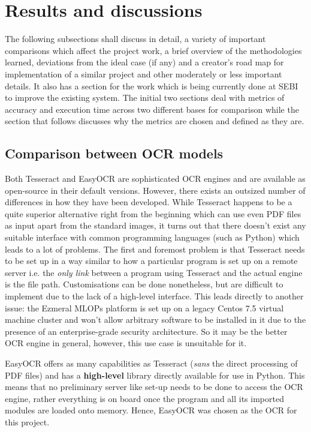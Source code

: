 \chapter{Results and discussions} \label{chapter5}

The following subsections shall discuss in detail, a variety of important comparisons which affect the project work, a brief overview of the methodologies learned, deviations from the ideal case (if any) and a creator’s road map for implementation of a similar project and other moderately or less important details. It also has a section for the work which is being currently done at SEBI to improve the existing system. The initial two sections deal with metrics of accuracy and execution time across two different bases for comparison while the section that follows discusses why the metrics are chosen and defined as they are. \par

\section{Comparison between OCR models} \label{comp_ocr}

Both Tesseract and EasyOCR are sophisticated OCR engines and are available as open-source in their default versions. However, there exists an outsized number of differences in how they have been developed. While Tesseract \cite{Google2015} happens to be a quite superior alternative right from the beginning which can use even PDF files as input apart from the standard images, it turns out that there doesn’t exist any suitable interface with common programming languages (such as Python) which leads to a lot of problems. The first and foremost problem is that Tesseract needs to be set up in a way similar to how a particular program is set up on a remote server i.e. the \textit{only link} between a program using Tesseract and the actual engine is the file path. Customisations can be done nonetheless, but are difficult to implement due to the lack of a high-level interface. This leads directly to another issue: the Ezmeral MLOPs platform is set up on a legacy Centos 7.5 virtual machine cluster and won’t allow arbitrary software to be installed in it due to the presence of an enterprise-grade security architecture.  So it may be the better OCR engine in general, however, this use case is unsuitable for it.\par

EasyOCR offers as many capabilities \cite{Jaided2020} as Tesseract (\textit{sans} the direct processing of PDF files) and has a \textbf{high-level} library directly available for use in Python. This means that no preliminary server like set-up needs to be done to access the OCR engine, rather everything is on board once the program and all its imported modules are loaded onto memory. Hence, EasyOCR was chosen as the OCR for this project. \par

